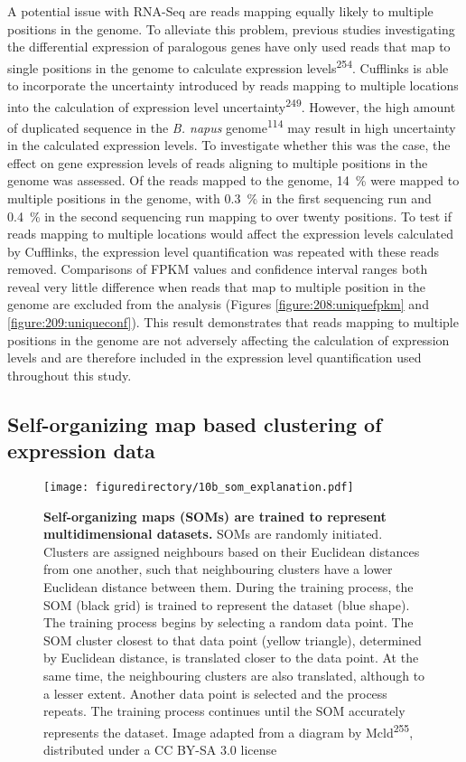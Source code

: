 \documentclass[12pt,]{book}
\begin{document}
A potential issue with RNA-Seq are reads mapping equally likely to
multiple positions in the genome. To alleviate this problem, previous
studies investigating the differential expression of paralogous genes
have only used reads that map to single positions in the genome to
calculate expression levels\textsuperscript{254}. Cufflinks is able to
incorporate the uncertainty introduced by reads mapping to multiple
locations into the calculation of expression level
uncertainty\textsuperscript{249}. However, the high amount of duplicated
sequence in the \emph{B. napus} genome\textsuperscript{114} may result
in high uncertainty in the calculated expression levels. To investigate
whether this was the case, the effect on gene expression levels of reads
aligning to multiple positions in the genome was assessed. Of the reads
mapped to the genome, 14~\% were mapped to multiple positions in the
genome, with 0.3~\% in the first sequencing run and 0.4~\% in the second
sequencing run mapping to over twenty positions. To test if reads
mapping to multiple locations would affect the expression levels
calculated by Cufflinks, the expression level quantification was
repeated with these reads removed. Comparisons of FPKM values and
confidence interval ranges both reveal very little difference when reads
that map to multiple position in the genome are excluded from the
analysis (Figures \ref{figure:208:uniquefpkm} and
\ref{figure:209:uniqueconf}). This result demonstrates that reads
mapping to multiple positions in the genome are not adversely affecting
the calculation of expression levels and are therefore included in the
expression level quantification used throughout this study.

\subsection{Self-organizing map based clustering of expression
data}\label{section:spring:somexplanation}

\begin{figure}[htbp]
\centering
\texttt{[image: figuredirectory/10b\_som\_explanation.pdf]}
\caption{\textbf{Self-organizing maps (SOMs) are trained to represent
multidimensional datasets.} SOMs are randomly initiated. Clusters are
assigned neighbours based on their Euclidean distances from one another,
such that neighbouring clusters have a lower Euclidean distance between
them. During the training process, the SOM (black grid) is trained to
represent the dataset (blue shape). The training process begins by
selecting a random data point. The SOM cluster closest to that data
point (yellow triangle), determined by Euclidean distance, is translated
closer to the data point. At the same time, the neighbouring clusters
are also translated, although to a lesser extent. Another data point is
selected and the process repeats. The training process continues until
the SOM accurately represents the dataset. Image adapted from a diagram
by Mcld\textsuperscript{255}, distributed under a CC BY-SA 3.0
license}\label{figure:215:somexplanation}
\end{figure}
\end{document}
